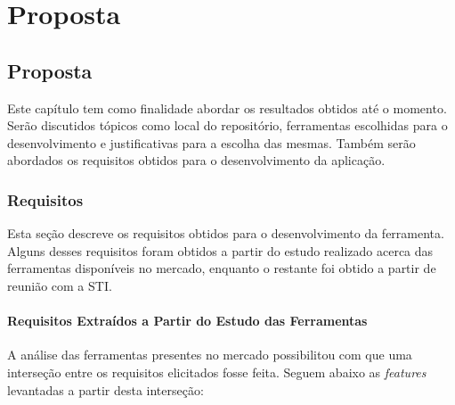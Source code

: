 \part{Proposta}

\chapter[Proposta]{Proposta}

Este capítulo tem como finalidade abordar os resultados obtidos até o momento. Serão discutidos tópicos como local do repositório, ferramentas escolhidas para o desenvolvimento e justificativas para a escolha das mesmas. Também serão abordados os requisitos obtidos para o desenvolvimento da aplicação.


\section{Requisitos}

Esta seção descreve os requisitos obtidos para o desenvolvimento da ferramenta. Alguns desses requisitos foram obtidos a partir do estudo realizado acerca das ferramentas disponíveis no mercado, enquanto o restante foi obtido a partir de reunião com a STI.

\subsection{Requisitos Extraídos a Partir do Estudo das Ferramentas}

A análise das ferramentas presentes no mercado possibilitou com que uma interseção entre os requisitos elicitados fosse feita. Seguem abaixo as \textit{features} levantadas a partir desta interseção:

